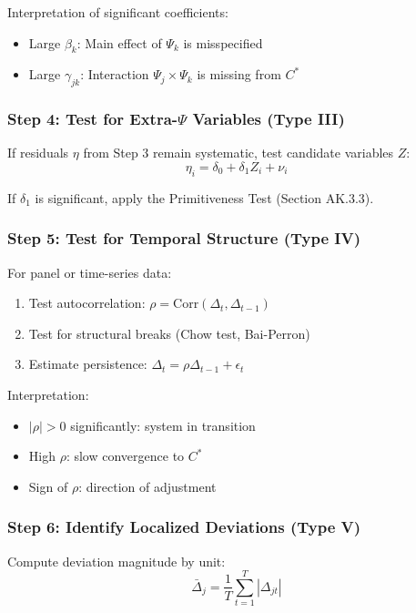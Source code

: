 Interpretation of significant coefficients:
\begin{itemize}
    \item Large $\beta_k$: Main effect of $\Psi_k$ is misspecified
    \item Large $\gamma_{jk}$: Interaction $\Psi_j \times \Psi_k$ is missing from $C^*$
\end{itemize}

\subsubsection{Step 4: Test for Extra-$\Psi$ Variables (Type III)}

If residuals $\eta$ from Step 3 remain systematic, test candidate variables $Z$:
\begin{equation}
\eta_i = \delta_0 + \delta_1 Z_i + \nu_i
\end{equation}

If $\delta_1$ is significant, apply the Primitiveness Test (Section AK.3.3).

\subsubsection{Step 5: Test for Temporal Structure (Type IV)}

For panel or time-series data:
\begin{enumerate}
    \item Test autocorrelation: $\rho = \text{Corr}(\Delta_t, \Delta_{t-1})$
    \item Test for structural breaks (Chow test, Bai-Perron)
    \item Estimate persistence: $\Delta_t = \rho \Delta_{t-1} + \epsilon_t$
\end{enumerate}

Interpretation:
\begin{itemize}
    \item $|\rho| > 0$ significantly: system in transition
    \item High $\rho$: slow convergence to $C^*$
    \item Sign of $\rho$: direction of adjustment
\end{itemize}

\subsubsection{Step 6: Identify Localized Deviations (Type V)}

Compute deviation magnitude by unit:
\begin{equation}
\bar{\Delta}_j = \frac{1}{T} \sum_{t=1}^{T} |\Delta_{jt}|
\end{equation}

